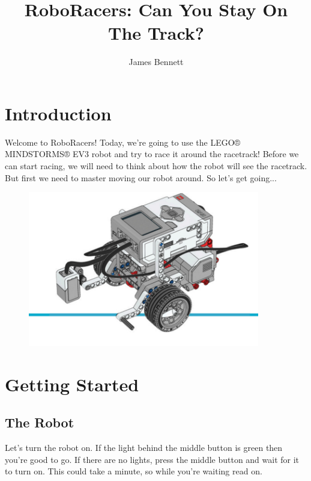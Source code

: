 \documentclass[12pt,a4paper]{article}
\title{RoboRacers: Can You Stay On The Track?}
\author{James Bennett}
\begin{document}
\maketitle

\section{Introduction}
Welcome to RoboRacers! Today, we're going to use the LEGO® MINDSTORMS® EV3 robot and try to race it around the racetrack! Before we can start racing, we will need to think about how the robot will see the racetrack. But first we need to master moving our robot around. So let's get going...

\begin{figure}[h]
    \centering
    \includegraphics[width=0.9\textwidth]{assets/robot_overview.jpg}
\end{figure}


\section{Getting Started}
\subsection{The Robot}
Let's turn the robot on. If the light behind the middle button is green then you're good to go. If there are no lights, press the middle button and wait for it to turn on. This could take a minute, so while you're waiting read on.
\end{document}

